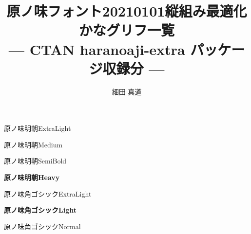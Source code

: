 \documentclass[dvipdfmx]{jsarticle}
\title{原ノ味フォント20210101縦組み最適化かなグリフ一覧\\
--- CTAN haranoaji-extra パッケージ収録分 ---}
\author{細田 真道}
\begin{document}
\maketitle
{}

\clearpage
\parindent=0pt
\fboxsep=0pt

\mcfamily\ltseries
{\huge 原ノ味明朝\textmd{ExtraLight}}

\testAll

\clearpage

\mcfamily\mdseries
{\huge 原ノ味明朝\textmd{Medium}}

\testAll

\clearpage

\mgfamily %
{\huge 原ノ味明朝\textmd{SemiBold}}

\testAll

\clearpage

\mcfamily\bfseries
{\huge 原ノ味明朝\textmd{Heavy}}

\testAll

\clearpage

\gtfamily\mdseries
{\huge 原ノ味角ゴシック\textmd{ExtraLight}}

\testAll

\clearpage

\gtfamily\bfseries
{\huge 原ノ味角ゴシック\textmd{Light}}

\testAll

\clearpage

\gtfamily\ebseries
{\huge 原ノ味角ゴシック\textmd{Normal}}

\testAll
\end{document}
